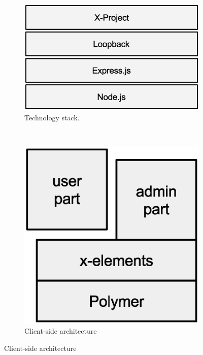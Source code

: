 \documentclass{sig-alternate}
\begin{document}


\begin{figure}[!h]
 \centering
 \begin{subfigure}[b]{0.53\linewidth}
 \includegraphics[width=\textwidth]{images/stack.eps} 
 \caption{Technology stack.}
 \label{fig:tech-stack}
 \end{subfigure}
 ~
 \begin{subfigure}[b]{0.43\linewidth}
 \includegraphics[width=\textwidth]{images/client-arch.eps}
 \caption{Client-side architecture}
 \label{fig:client-arch}
 \end{subfigure}
 
\end{figure}
\end{document}
